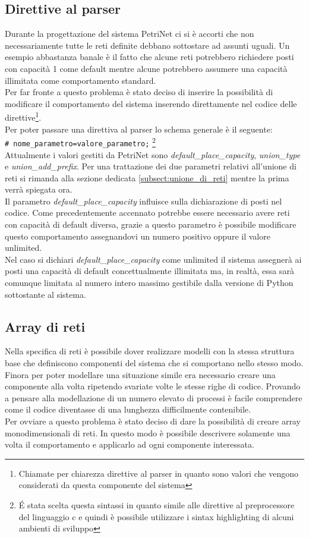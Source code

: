 \documentclass[italian,12pt]{book}
\begin{document}
\subsection{Direttive al parser}\label{subsec:direttive_al_parser}
Durante la progettazione del sistema PetriNet ci si è accorti che non
necessariamente tutte le reti definite debbano sottostare ad assunti
uguali. Un esempio abbastanza banale è il fatto che alcune reti
potrebbero richiedere posti con capacità 1 come default mentre alcune
potrebbero assumere una capacità illimitata come comportamento
standard. \\
Per far fronte a questo problema è stato deciso di inserire la
possibilità di modificare il comportamento del sistema inserendo
direttamente nel codice delle direttive\footnote{Chiamate per
  chiarezza direttive al parser in quanto sono valori che vengono
  considerati da questa componente del sistema}.\\
Per poter passare una direttiva al parser lo schema generale è il
seguente: \\
{\tt \# nome\_parametro=valore\_parametro;} \footnote{\'E stata
  scelta questa sintassi in quanto simile alle direttive al
  preprocessore del linguaggio c e quindi è possibile utilizzare i
  sintax highlighting di alcuni ambienti di sviluppo} \\
Attualmente i valori gestiti da PetriNet sono
\emph{default\_place\_capacity}, \emph{union\_type} e
\emph{union\_add\_prefix}. Per una trattazione dei due parametri
relativi all'unione di reti si rimanda alla sezione dedicata
\ref{subsect:unione_di_reti} mentre la prima verrà spiegata ora. \\
Il parametro \emph{default\_place\_capacity} influisce sulla
dichiarazione di posti nel codice. Come precedentemente accennato
potrebbe essere necessario avere reti con capacità di default diversa,
grazie a questo parametro è possibile modificare questo comportamento
assegnandovi un numero positivo oppure il valore unlimited. \\
Nel caso si dichiari \emph{default\_place\_capacity} come unlimited il
sistema assegnerà ai posti una capacità di default concettualmente
illimitata ma, in realtà, essa sarà comunque limitata al numero intero
massimo gestibile dalla versione di Python sottostante al sistema.

\subsection{Array di reti}\label{sviluppo:array}
Nella specifica di reti è possibile dover realizzare modelli con la stessa struttura base che 
definiscono componenti del sistema che si comportano nello stesso modo. Finora per poter modellare 
una situazione simile era necessario creare una componente alla volta ripetendo svariate volte 
le stesse righe di codice. Provando a pensare alla modellazione di un numero elevato di processi è 
facile comprendere come il codice diventasse di una lunghezza difficilmente contenibile. \\
Per ovviare a questo problema è stato deciso di dare la possibilità di creare array monodimensionali 
di reti. In questo modo è possibile descrivere solamente una volta il comportamento e applicarlo ad 
ogni componente interessata.
\end{document}

